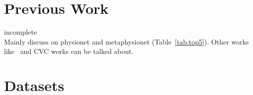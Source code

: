 \documentclass[pmlr,twocolumn]{jmlr}%
\begin{document}
\begin{table}[tbp]
\label{tab:top5}
{\caption{Top 5 teams in Physionet2020 and pre-processing functions used.}}%
    
    { 
}

\end{table}
\section{Previous Work}
\label{sec:prevwork}
{\color{red} incomplete}\\
Mainly discuss on physionet and metaphysionet (Table~\ref{tab:top5}). Other works like~\cite{ribeiro2020automatic} and CVC works can be talked about. 
\section{Datasets}
\label{datasets}
\end{document}

